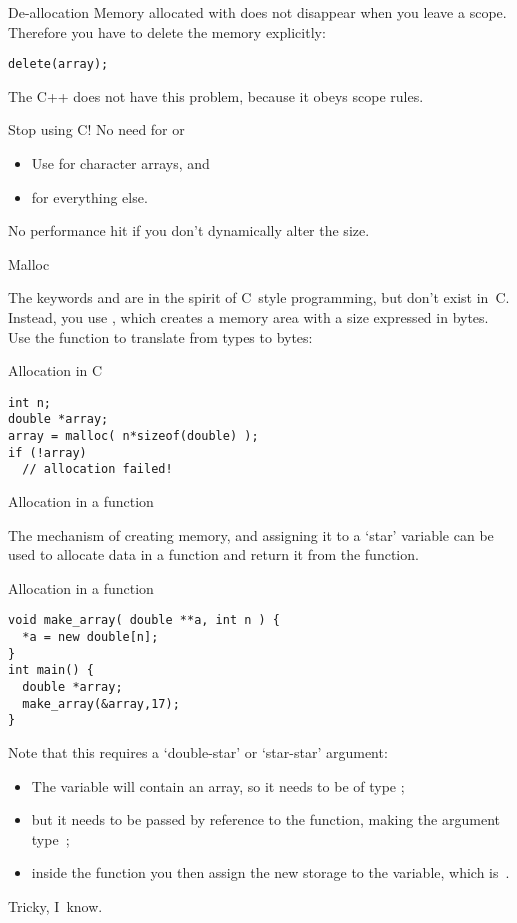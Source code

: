 \begin{block}{De-allocation}
  \label{sl:c-array-del}
  Memory allocated with  does not disappear when you leave a
  scope. Therefore you have to delete the memory explicitly:
\begin{verbatim}
delete(array);
\end{verbatim}
The C++  does not have this problem, because it obeys scope rules.
\end{block}

\begin{block}{Stop using C!}
  \label{sl:no-c-malloc}
  No need for  or 
  \begin{itemize}
  \item Use  for character arrays, and
  \item {} for everything else.
  \end{itemize}
  No performance hit if you don't dynamically alter the size.
\end{block}

 {Malloc}

The keywords  and  are in the spirit of C~style
programming, but don't exist in~C. Instead, you use
, which creates a memory area with a size
expressed in bytes. Use the function  to translate
from types to bytes:

\begin{block}{Allocation in C}
\begin{verbatim}
int n;
double *array;
array = malloc( n*sizeof(double) );
if (!array)
  // allocation failed!
\end{verbatim}
\end{block}

 {Allocation in a function}

The mechanism of creating memory, and assigning it to a `star'
variable
can be used to allocate data in a function and
return it from the function.

\begin{block}{Allocation in a function}
\begin{verbatim}
void make_array( double **a, int n ) {
  *a = new double[n];
}
int main() {
  double *array;
  make_array(&array,17);
}
\end{verbatim}
\end{block}

Note that this requires a `double-star' or `star-star' argument:
\begin{itemize}
\item The variable  will contain an array, so it needs to be of
  type ;
\item but it needs to be passed by reference to the function, making
  the argument type~;
\item inside the function you then assign the new storage to the
   variable, which is~.
\end{itemize}
Tricky, I~know.

